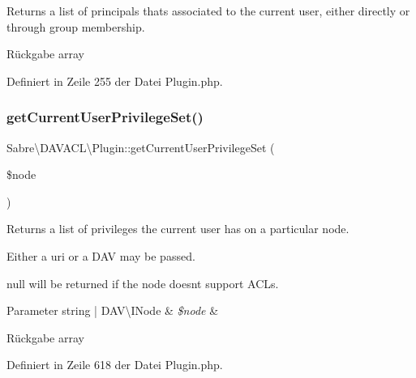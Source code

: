 Returns a list of principals that\textquotesingle{}s associated to the current user, either directly or through group membership.

\begin{DoxyReturn}{Rückgabe}
array 
\end{DoxyReturn}


Definiert in Zeile 255 der Datei Plugin.\+php.

\mbox{\label{class_sabre_1_1_d_a_v_a_c_l_1_1_plugin_aea94f82c23c1b7f8df83e686878e8e3f}} 
\subsubsection{\texorpdfstring{get\+Current\+User\+Privilege\+Set()}{getCurrentUserPrivilegeSet()}}
{\footnotesize\ttfamily Sabre\textbackslash{}\+D\+A\+V\+A\+C\+L\textbackslash{}\+Plugin\+::get\+Current\+User\+Privilege\+Set (\begin{DoxyParamCaption}\item[{}]{\$node }\end{DoxyParamCaption})}

Returns a list of privileges the current user has on a particular node.

Either a uri or a D\+AV may be passed.

null will be returned if the node doesn\textquotesingle{}t support A\+C\+Ls.


\begin{DoxyParams}[1]{Parameter}
string | D\+A\+V\textbackslash{}\+I\+Node & {\em \$node} & \\
\hline
\end{DoxyParams}
\begin{DoxyReturn}{Rückgabe}
array 
\end{DoxyReturn}


Definiert in Zeile 618 der Datei Plugin.\+php.

\mbox{\label{class_sabre_1_1_d_a_v_a_c_l_1_1_plugin_ac828731b3514af22c391cb326a67d4c5}} 

